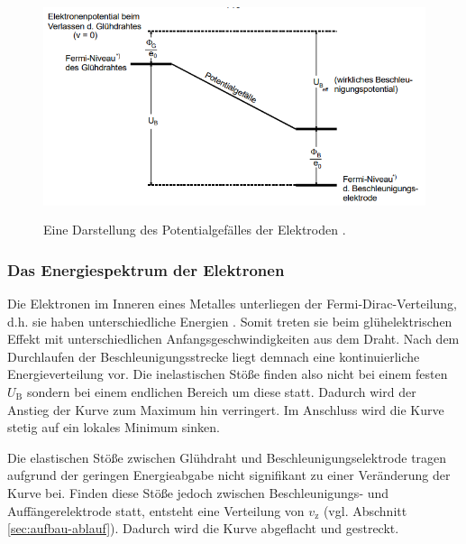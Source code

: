 \begin{figure}[H]
    \centering
    \includegraphics[height = 6.5cm]{bilder/potential.png}
    \caption{Eine Darstellung des Potentialgefälles der Elektroden \cite{man:v601}.}
    \label{fig:potential}
\end{figure}
\noindent

\subsubsection{Das Energiespektrum der Elektronen}
Die Elektronen im Inneren eines Metalles unterliegen der Fermi-Dirac-Verteilung, d.h. sie haben unterschiedliche Energien \cite{man:v504}.
Somit treten sie beim glühelektrischen Effekt mit unterschiedlichen Anfangsgeschwindigkeiten aus dem Draht.
Nach dem Durchlaufen der Beschleunigungsstrecke liegt demnach eine kontinuierliche Energieverteilung vor.
Die inelastischen Stöße finden also nicht bei einem festen $U_\text{B}$ sondern bei einem endlichen Bereich um diese statt.
Dadurch wird der Anstieg der Kurve zum Maximum hin verringert.
Im Anschluss wird die Kurve stetig auf ein lokales Minimum sinken.

\noindent
Die elastischen Stöße zwischen Glühdraht und Beschleunigungselektrode tragen aufgrund der geringen Energieabgabe nicht signifikant zu einer Veränderung der Kurve bei.
Finden diese Stöße jedoch zwischen Beschleunigungs- und Auffängerelektrode statt, entsteht eine Verteilung von $v_\text{z}$ (vgl. Abschnitt \ref{sec:aufbau-ablauf}).
Dadurch wird die Kurve abgeflacht und gestreckt.

